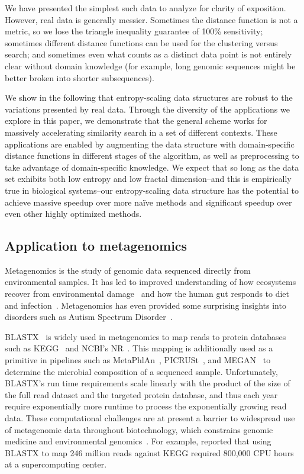 \documentclass[review,preprint,12pt]{elsarticle}
\renewcommand{\cite}{\citep} %
\theoremstyle{definition}
\theoremstyle{remark}
\numberwithin{equation}{section}
\begin{document}
We have presented the simplest such data to analyze for clarity of exposition.
However, real data is generally messier.
Sometimes the distance function is not a metric, so we lose the triangle inequality guarantee of 100\% sensitivity;
sometimes different distance functions can be used for the clustering versus search;
and sometimes even what counts as a distinct data point is not entirely clear without domain knowledge (for example, long genomic sequences might be better broken into shorter subsequences).

We show in the following that entropy-scaling data structures are robust to the variations presented by real data.
Through the diversity of the applications we explore in this paper, we demonstrate that the general scheme works for massively accelerating similarity search in a set of different contexts.
These applications are enabled by augmenting the data structure with domain-specific distance functions in different stages of the algorithm, as well as preprocessing to take advantage of domain-specific knowledge.
We expect that so long as the data set exhibits both low entropy and low 
fractal dimension--and this is empirically true in biological systems--our 
entropy-scaling data structure has the potential to achieve massive speedup 
over more na\"ive methods and significant speedup over even other highly 
optimized methods.

\subsection{Application to metagenomics}

Metagenomics is the study of genomic data sequenced directly from environmental
samples.
It has led to improved understanding of how ecosystems recover
from environmental damage~\cite{tyson2004community} and how the human gut responds 
to diet
and infection~\cite{david2014host}.
Metagenomics has even provided some surprising insights into disorders 
such as Autism Spectrum Disorder~\cite{macfabe2012short}.

BLASTX~\cite{altschul1990basic} is widely used in metagenomics to map
reads to protein databases such as KEGG~\cite{kanehisa2000kegg} and NCBI's 
NR~\cite{sayers2011database}.
This mapping is additionally used as a primitive in pipelines such as MetaPhlAn~\cite{segata2012metagenomic}, 
PICRUSt~\cite{langille2013predictive}, and MEGAN~\cite{huson2011integrative} to
determine the microbial composition of a sequenced sample.
Unfortunately, BLASTX's run time requirements scale linearly with the product 
of the size of the full read dataset and the targeted protein database, and 
thus each year require exponentially more runtime to process the exponentially 
growing read data. 
These computational challenges are at present a barrier to widespread use of 
metagenomic data throughout biotechnology, which constrains genomic medicine 
and environmental genomics~\cite{frank2008gastrointestinal}.
For example, \citet{mackelprang2011metagenomic} reported that using BLASTX to map 246
million reads against KEGG required 800,000 CPU hours at a supercomputing 
center.
\end{document}
